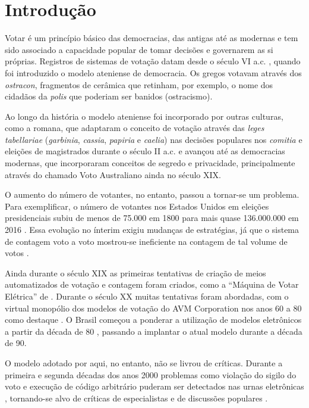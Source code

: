 \chapter{Introdução}
Votar é um princípio básico das democracias, das antigas até as modernas e tem sido associado a capacidade popular de tomar decisões e governarem as si próprias. Registros de sistemas de votação datam desde o século VI a.c. \cite{BLACKWELL2003}, quando foi introduzido o modelo ateniense de democracia. Os gregos votavam através dos \textit{ostracon}, fragmentos de cerâmica que retinham, por exemplo, o nome dos cidadãos da \textit{\Gls{polis}} que poderiam ser banidos (ostracismo).  

Ao longo da história o modelo ateniense foi incorporado por outras culturas, como a romana, que adaptaram o conceito de votação através das \textit{leges tabellariae} (\textit{garbinia}, \textit{cassia}, \textit{papiria} e \textit{caelia}) nas decisões populares nos \textit{\gls{comitia}} e eleições de magistrados durante o século II a.c. \cite{Yakobson1995} e avançou até as democracias modernas, que incorporaram conceitos de segredo e privacidade, principalmente através do chamado Voto Australiano \cite{Newman2003} ainda no século XIX.  

O aumento do número de votantes, no entanto, passou a tornar-se um problema. Para exemplificar, o número de votantes nos Estados Unidos em eleições presidenciais subiu de menos de 75.000 em 1800 \cite{VoteArchive2015} para mais quase 136.000.000 em 2016 \cite{VoteArchive2016}. Essa evolução no ínterim exigiu mudanças de estratégias, já que o sistema de contagem voto a voto mostrou-se ineficiente na contagem de tal volume de votos \cite{BATTAGLINI2007}. 

Ainda durante o século XIX as primeiras tentativas de criação de meios automatizados de votação e contagem foram criados, como a “Máquina de Votar Elétrica” de . Durante o século XX muitas tentativas foram abordadas, com o virtual monopólio dos modelos de votação do AVM Corporation nos anos 60 a 80 como destaque \cite{Jones2012}. O Brasil começou a ponderar a utilização de modelos eletrônicos a partir da década de 80 \cite{Brasil2014}, passando a implantar o atual modelo durante a década de 90.  

O modelo adotado por aqui, no entanto, não se livrou de críticas. Durante a primeira e segunda décadas dos anos 2000 problemas como violação do sigilo do voto e execução de código arbitrário puderam ser detectados nas urnas eletrônicas \cite{VandeGraaf2017}, tornando-se alvo de críticas de especialistas \cite{Aranha2018} e de discussões populares \cite{Payao2018}.  

